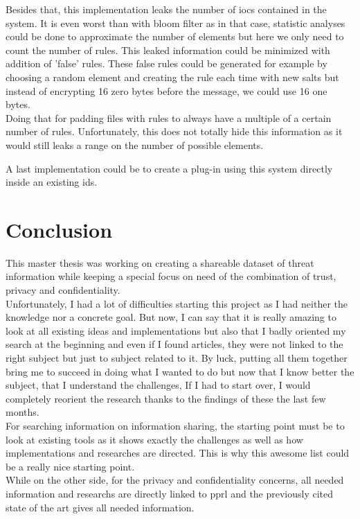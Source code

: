 \documentclass{eplmastersthesis}
\begin{document}
Besides that, this implementation leaks the number of \gls{ioc}s contained in the system. It is even worst than with bloom filter as in that case, statistic analyses could be done to approximate the number of elements but here we only need to count the number of rules. This leaked information could be minimized with addition of 'false' rules.  These false rules could be generated for example by choosing a random element and creating the rule each time with new salts but instead of encrypting 16 zero bytes before the message, we could use 16 one bytes.\\
Doing that for padding files with rules to always have a multiple of a certain number of rules. Unfortunately, this does not totally hide this information as it would still leaks a range on the number of possible elements.

A last implementation could be to create a plug-in using this system directly inside an existing \gls{ids}.


\section{Conclusion}
This master thesis was working on creating a shareable dataset of threat information while keeping a special focus on need of the combination of trust, privacy and confidentiality.\\
Unfortunately, I had a lot of difficulties starting this project as I had neither the knowledge nor a concrete goal. But now, I can say that it is really amazing to look at all existing ideas and implementations but also that I badly oriented my search at the beginning and even if I found articles, they were not linked to the right subject but just to subject related to it. By luck, putting all them together bring me to succeed in doing what I wanted to do but now that I know better the subject, that I understand the challenges, If I had to start over, I would completely reorient the research thanks to the findings of these the last few months.\\
For searching information on information sharing, the starting point must be to look at existing tools as it shows exactly the challenges as well as how implementations and researches are directed. This is why this awesome list \cite{AwesomeTreat} could be a really nice starting point.\\
While on the other side, for the privacy and confidentiality concerns, all needed information and researchs are directly linked to \gls{pprl} and the previously cited state of the art \cite{vatsalanprivacy} gives all needed information.\\
\end{document}
